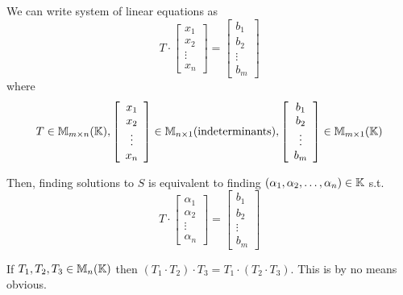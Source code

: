 \begin{observe}
    We can write system of linear equations as \[
        T \cdot \left[
            \begin{array}{c}
                x_1 \\ x_2 \\ \vdots \\ x_n
            \end{array}
            \right] = \left[
            \begin{array}{c}
                b_1 \\ b_2 \\ \vdots \\ b_m
            \end{array}
            \right]
    \] where \[
        T \in \mathbb{M}_{m\times n}(\mathbb{K}), \left[
            \begin{array}{c}
                x_1 \\ x_2 \\ \vdots \\ x_n
            \end{array}
            \right] \in \mathbb{M}_{n \times 1}(\text{indeterminants}), \left[
            \begin{array}{c}
                b_1 \\ b_2 \\ \vdots \\ b_m
            \end{array}
            \right] \in \mathbb{M}_{m \times 1}(\mathbb{K})
    \]

    Then, finding solutions to \(S\) is equivalent to finding \((\alpha_1, \alpha_2, \dots, \alpha_n) \in \mathbb{K}\) s.t.
    \[
        T \cdot \left[
            \begin{array}{c}
                \alpha_1 \\ \alpha_2 \\ \vdots \\ \alpha_n
            \end{array}
            \right] = \left[
            \begin{array}{c}
                b_1 \\ b_2 \\ \vdots \\ b_m
            \end{array}
            \right]
    \]
\end{observe}

\begin{exercise}
    If \(T_1, T_2, T_3 \in \mathbb{M}_n(\mathbb{K})\) then \((T_1 \cdot T_2) \cdot T_3 = T_1 \cdot (T_2 \cdot T_3)\). This is by no means obvious.
\end{exercise}

